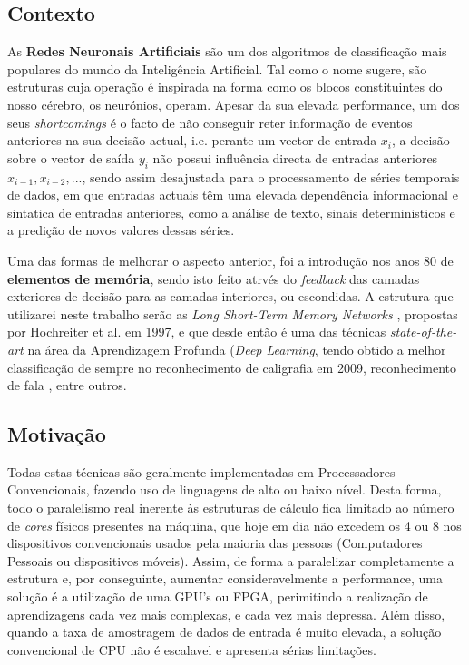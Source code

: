 \documentclass[a4paper, onecolumn, 10pt]{article}
\begin{document}
	\subsection{Contexto}
	As \textbf{Redes Neuronais Artificiais} são  um dos algoritmos de classificação mais populares do mundo da Inteligência Artificial. Tal como o nome sugere, são estruturas cuja operação é inspirada na forma como os blocos constituintes do nosso cérebro, os neurónios, operam. Apesar da sua elevada performance, um dos seus \textit{shortcomings} é o facto de não conseguir reter informação de eventos anteriores na sua decisão actual, i.e. perante um vector de entrada $x_i$, a decisão sobre o vector de saída $y_i$ não possui influência directa de entradas anteriores $x_{i-1}, x_{i-2}, ...$, sendo assim desajustada para o processamento de séries temporais de dados, em que entradas actuais têm uma elevada dependência informacional e sintatica de entradas anteriores, como a análise de texto, sinais deterministicos e a predição de novos valores dessas séries.

	Uma das formas de melhorar o aspecto anterior, foi a introdução nos anos 80 de \textbf{elementos de memória}, sendo isto feito atrvés do \textit{feedback} das camadas exteriores de decisão para as camadas interiores, ou escondidas. A estrutura que utilizarei neste trabalho serão as \textit{Long Short-Term Memory Networks} \autocite{hochreiter-lstm}, propostas por Hochreiter et al. em 1997, e que desde então é uma das técnicas \textit{state-of-the-art} na área da Aprendizagem Profunda (\textit{Deep Learning}, tendo obtido a melhor classificação de sempre no reconhecimento de caligrafia \autocite{hochreiter-hrr} em 2009, reconhecimento de fala \autocite{speechRec-lstm}, entre outros.  

	\subsection{Motivação}
	Todas estas técnicas são geralmente implementadas em Processadores Convencionais, fazendo uso de linguagens de alto ou baixo nível. Desta forma, todo o paralelismo real inerente às estruturas de cálculo fica limitado ao número de \textit{cores} físicos presentes na máquina, que hoje em dia não excedem os 4 ou 8 nos dispositivos convencionais usados pela maioria das pessoas (Computadores Pessoais ou dispositivos móveis). Assim, de forma a paralelizar completamente a estrutura e, por conseguinte, aumentar consideravelmente a performance, uma solução é a utilização de uma GPU's ou FPGA, perimitindo a realização de aprendizagens cada vez mais complexas, e cada vez mais depressa. Além disso, quando a taxa de amostragem de dados de entrada é muito elevada, a solução convencional de CPU não é escalavel e apresenta sérias limitações. 
	
\end{document}
